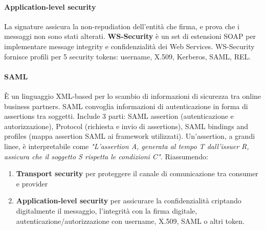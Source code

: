 \documentclass[11pt]{article}
\begin{document}
\paragraph{Application-level security} La signature assicura la non-repudiation dell'entità che firma, e prova che i messaggi non sono stati alterati. \textbf{WS-Security} è un set di estensioni SOAP per implementare message integrity e confidenzialità dei Web Services. WS-Security fornisce profili per 5 security tokens: username, X.509, Kerberos, SAML, REL.
\paragraph{SAML} È un linguaggio XML-based per lo scambio di informazioni di sicurezza tra online business partners. SAML convoglia informazioni di autenticazione in forma di assertions tra soggetti. Include 3 parti: SAML assertion (autenticazione e autorizzazione), Protocol (richiesta e invio di assertions), SAML bindings and profiles (mappa assertion SAML ai framework utilizzati).
Un'assertion, a grandi linee, è interpretabile come \textit{"L'assertion A, generata al tempo T dall'issuer R, assicura che il soggetto S rispetta le condizioni C".} Riassumendo:
\begin{enumerate}
    \item \textbf{Transport security} per proteggere il canale di comunicazione tra consumer e provider 
    \item \textbf{Application-level security} per assicurare la confidenzialità criptando digitalmente il messaggio, l'integrità con la firma digitale, autenticazione/autorizzazione con username, X.509, SAML o altri token.
\end{enumerate}
\end{document}
